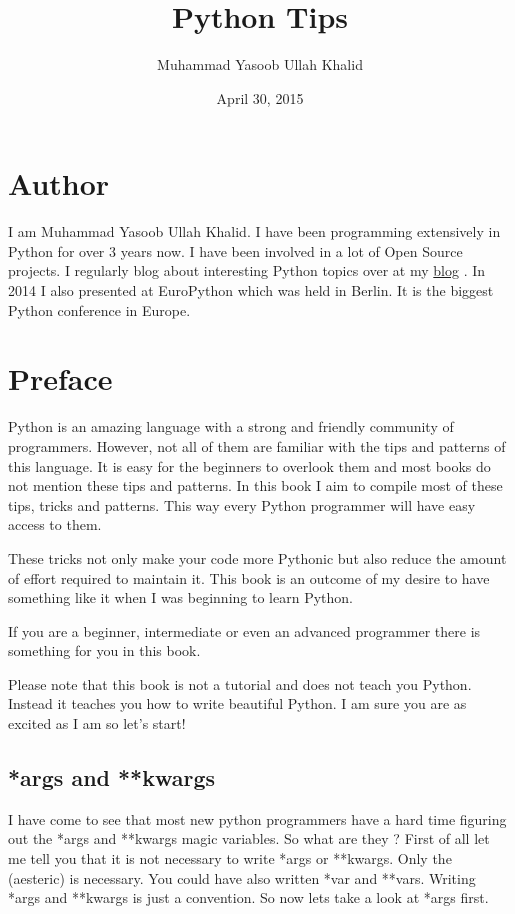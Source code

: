 \documentclass[a4paper,12pt,oneside]{sphinxmanual}
\title{Python Tips}
\date{April 30, 2015}
\author{Muhammad Yasoob Ullah Khalid}
\begin{document}
\maketitle
\tableofcontents
{}\label{index::doc}



\part{Author}
\label{index:python-tips}\label{index:author}
I am Muhammad Yasoob Ullah Khalid. I have been programming extensively in Python for over 3 years now. I have been involved in a lot of Open Source projects. I regularly blog about interesting Python topics over at my \href{http://www.freepythontips.wordpress.com}{blog} . In 2014 I also presented at EuroPython which was held in Berlin. It is the biggest Python conference in Europe.


\part{Preface}
\label{index:preface}
Python is an amazing language with a strong and friendly community of programmers. However, not all of them are familiar with the tips and patterns of this language. It is easy for the beginners to overlook them and most books do not mention these tips and patterns. In this book I aim to compile most of these tips, tricks and patterns. This way every Python programmer will have easy access to them.

These tricks not only make your code more Pythonic but also reduce the amount of effort required to maintain it. This book is an outcome of my desire to have something like it when I was beginning to learn Python.

If you are a beginner, intermediate or even an advanced programmer there is something for you in this book.

Please note that this book is not a tutorial and does not teach you Python. Instead it teaches you how to write beautiful Python. I am sure you are as excited as I am so let's start!


\chapter{*args and **kwargs}
\label{args_and_kwargs:args-and-kwargs}\label{args_and_kwargs::doc}
I have come to see that most new python programmers have a hard time
figuring out the *args and **kwargs magic variables. So what are they
? First of all let me tell you that it is not necessary to write *args
or **kwargs. Only the \code{*} (aesteric) is necessary. You could have
also written *var and **vars. Writing *args and **kwargs is just a
convention. So now lets take a look at *args first.
\end{document}
